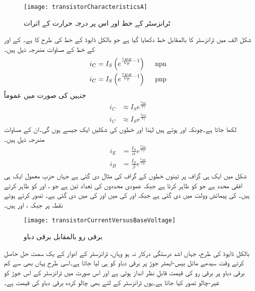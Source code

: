 \begin{figure}
\centering
\texttt{[image: transistorCharacteristicsA]}
\caption{ٹرانزسٹر کے خط اور اس پر درجہ حرارت کے اثرات}
\label{شکل_ٹرانزسٹر_کے_خط_بالمقابل_حرارت}
\end{figure}
%
شکل  الف میں  ٹرانزسٹر کا  بالمقابل  خط دکھایا گیا ہے جو بالکل ڈایوڈ کے خط کی طرح کا ہے۔ کے  اور  کے  خط کے مساوات مندرجہ ذیل ہیں۔
\begin{align}\label{مساوات_ٹرانزسٹر_کی_بنیادی_مساوات}
i_C&=I_S \left (e^{\frac{v_{BE}}{V_T}-1} \right ) \hspace{5mm} \text{npn}\\
i_C&=I_S \left (e^{\frac{v_{EB}}{V_T}-1} \right) \hspace{5mm} \text{pnp}
\end{align}
جنہیں  کی صورت میں عموماً
\begin{align}
i_C& \approx I_S e^{\frac{v_{BE}}{V_T}}\\
i_C& \approx I_S e^{\frac{v_{EB}}{V_T}}
\end{align}
لکھا جاتا ہے۔چونکہ   اور   ہوتے ہیں لہٰذا  اور   خطوں کی شکلیں ایک جیسے ہوں گی۔ان کے مساوات مندرجہ ذیل ہیں۔
\begin{align}
i_E&=\frac{I_S}{\alpha} e^{\frac{v_{BE}}{V_T}}\\
i_B&=\frac{I_S}{\beta} e^{\frac{v_{BE}}{V_T}}
\end{align}
شکل   میں ایک ہی گراف پر تینوں خطوں کے گراف کی مثال دی گئی ہے جہاں حزبِ معمول ایک ہی افقی محدد ہے جو  کو ظاہر کرتا ہے جبکہ عمودی محددوں کی تعداد تین ہے جو  ، اور  کو ظاہر کرتے ہیں۔  کی پیمائش وولٹ   میں دی گئی ہے جبکہ   اور   کی   میں اور   کی   میں دی گئی ہے۔   تصور کرتے ہوئے  نقطہ  پر  جبکہ   ،  اور  ہیں۔
\begin{figure}
\centering
\texttt{[image: transistorCurrentVersusBaseVoltage]}
\caption{برقی رو بالمقابل برقی دباو}
\label{شکل_برقی_رو_بالمقابل_برقی_دباو}
\end{figure}
بالکل ڈایوڈ کی طرح، جہاں اشد درستگی درکار نہ ہو وہاں، ٹرانزسٹر کے ادوار کے یک سمت حل حاصل کرتے وقت سیدھے مائل بیس-ایمٹر  جوڑ پر برقی دباو   کو  ہی لیا جاتا ہے۔اسی طرح یہاں بھی   سے کم برقی دباو پر برقی رو   کی قیمت قابلِ نظر انداز ہوتی ہے اور اس صورت میں ٹرانزسٹر کے اس جوڑ کو غیر-چالو تصور کیا جاتا ہے۔یوں ٹرانزسٹر کے لئے بھی چالو کردہ برقی دباو  کی قیمت  ہے۔

